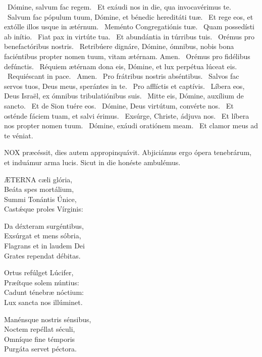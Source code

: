 \V\ Dómine, salvum fac regem. \R\ Et exáudi nos in die, qua invocavérimus te. \V\ Salvum fac pópulum tuum, Dómine, et bénedic hereditáti tuæ. \R\ Et rege eos, et extólle illos usque in ætérnum. \V\ Meménto Congregatiónis tuæ. \R\ Quam possedísti ab inítio. \V\ Fiat pax in virtúte tua. \R\ Et abundántia in túrribus tuis. \V\ Orémus pro benefactóribus nostris. \R\ Retribúere dignáre, Dómine, ómnibus, nobis bona faciéntibus propter nomen tuum, vitam ætérnam. Amen. \V\ Orémus pro fidélibus defúnctis. \R\ Réquiem ætérnam dona eis, Dómine, et lux perpétua lúceat eis. \V\ Requiéscant in pace. \R\ Amen. \V\ Pro frátribus nostris abséntibus. \R\ Salvos fac servos tuos, Deus meus, sperántes in te. \V\ Pro afflíctis et captívis. \R\ Líbera eos, Deus Israël, ex ómnibus tribulatiónibus suis. \V\ Mitte eis, Dómine, auxílium de sancto. \R\ Et de Sion tuére eos. \V\ Dómine, Deus virtútum, convérte nos. \R\ Et osténde fáciem tuam, et salvi érimus. \V\ Exsúrge, Christe, ádjuva nos. \R\ Et líbera nos propter nomen tuum. \V\ Dómine, exáudi oratiónem meam. \R\ Et clamor meus ad te véniat.




\lettrine[lines=2]{N}{OX} præcéssit, dies autem appropinquávit. Abjiciámus ergo ópera tenebrárum, et induámur arma lucis. Sicut in die honéste ambulémus.


\lettrine[lines=2]{Æ}{TERNA} cæli glória,\\
Beáta spes mortálium,\\
Summi Tonántis Únice,\\
Castǽque proles Vírginis:

Da déxteram surgéntibus,\\
Exsúrgat et mens sóbria,\\
Flagrans et in laudem Dei\\
Grates rependat débitas.

Ortus refúlget Lúcifer,\\
Præítque solem núntius:\\
Cadunt ténebræ nóctium:\\
Lux sancta nos illúminet.

Manénsque nostris sénsibus,\\
Noctem repéllat séculi,\\
Omníque fine témporis\\
Purgáta servet péctora.

